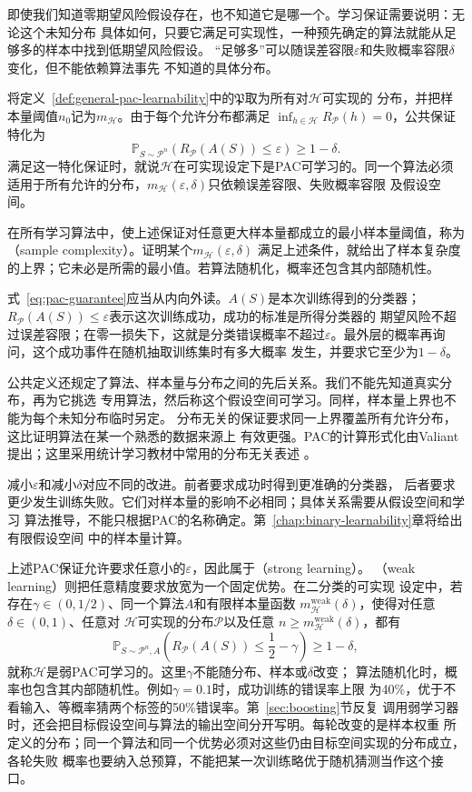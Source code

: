 即使我们知道零期望风险假设存在，也不知道它是哪一个。学习保证需要说明：无论这个未知分布
具体如何，只要它满足可实现性，一种预先确定的算法就能从足够多的样本中找到低期望风险假设。
“足够多”可以随误差容限$\varepsilon$和失败概率容限$\delta$变化，但不能依赖算法事先
不知道的具体分布。

将定义~\ref{def:general-pac-learnability}中的$\mathfrak P$取为所有对$\mathcal H$可实现的
分布，并把样本量阈值$n_0$记为$m_{\mathcal H}$。由于每个允许分布都满足
$\inf_{h\in\mathcal H}R_{\mathcal P}(h)=0$，公共保证特化为
\begin{equation}
 \mathbb P_{S\sim\mathcal P^n}
 \left(R_{\mathcal P}(A(S))\leq\varepsilon\right)\geq1-\delta.
 \label{eq:pac-guarantee}
\end{equation}
满足这一特化保证时，就说$\mathcal H$在可实现设定下是PAC可学习的。同一个算法必须
适用于所有允许的分布，$m_{\mathcal H}(\varepsilon,\delta)$只依赖误差容限、失败概率容限
及假设空间。

在所有学习算法中，使上述保证对任意更大样本量都成立的最小样本量阈值，称为
（sample complexity）。证明某个$m_{\mathcal H}(\varepsilon,\delta)$
满足上述条件，就给出了样本复杂度的上界；它未必是所需的最小值。若算法随机化，概率还包含其内部随机性。

式~\eqref{eq:pac-guarantee}应当从内向外读。$A(S)$是本次训练得到的分类器；
$R_{\mathcal P}(A(S))\leq\varepsilon$表示这次训练成功，成功的标准是所得分类器的
期望风险不超过误差容限；在零一损失下，这就是分类错误概率不超过$\varepsilon$。最外层的概率再询问，这个成功事件在随机抽取训练集时有多大概率
发生，并要求它至少为$1-\delta$。

公共定义还规定了算法、样本量与分布之间的先后关系。我们不能先知道真实分布，再为它挑选
专用算法，然后称这个假设空间可学习。同样，样本量上界也不能为每个未知分布临时另定。
分布无关的保证要求同一上界覆盖所有允许分布，这比证明算法在某一个熟悉的数据来源上
有效更强。PAC的计算形式化由Valiant提出；这里采用统计学习教材中常用的分布无关表述
。

减小$\varepsilon$和减小$\delta$对应不同的改进。前者要求成功时得到更准确的分类器，
后者要求更少发生训练失败。它们对样本量的影响不必相同；具体关系需要从假设空间和学习
算法推导，不能只根据PAC的名称确定。第~\ref{chap:binary-learnability}章将给出有限假设空间
中的样本量计算。

上述PAC保证允许要求任意小的$\varepsilon$，因此属于（strong learning）。
（weak learning）则把任意精度要求放宽为一个固定优势。在二分类的可实现
设定中，若存在$\gamma\in(0,1/2)$、同一个算法$A$和有限样本量函数
$m_{\mathcal H}^{\mathrm{weak}}(\delta)$，使得对任意$\delta\in(0,1)$、任意对
$\mathcal H$可实现的分布$\mathcal P$以及任意
$n\geq m_{\mathcal H}^{\mathrm{weak}}(\delta)$，都有
\[
 \mathbb P_{S\sim\mathcal P^n,A}\!\left(
 R_{\mathcal P}(A(S))\leq\frac12-\gamma
 \right)\geq1-\delta,
\]
就称$\mathcal H$是弱PAC可学习的。这里$\gamma$不能随分布、样本或$\delta$改变；
算法随机化时，概率也包含其内部随机性。例如$\gamma=0.1$时，成功训练的错误率上限
为40\%，优于不看输入、等概率猜两个标签的50\%错误率。第~\ref{sec:boosting}节反复
调用弱学习器时，还会把目标假设空间与算法的输出空间分开写明。每轮改变的是样本权重
所定义的分布；同一个算法和同一个优势必须对这些仍由目标空间实现的分布成立，各轮失败
概率也要纳入总预算，不能把某一次训练略优于随机猜测当作这个接口。


